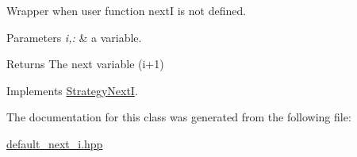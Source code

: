 \-Wrapper when user function next\-I is not defined. 


\begin{DoxyParams}{\-Parameters}
{\em i,\-:} & a variable. \\
\hline
\end{DoxyParams}
\begin{DoxyReturn}{\-Returns}
\-The next variable (i+1) 
\end{DoxyReturn}


\-Implements \hyperlink{classStrategyNextI_a3ae2498d9c8c316b9248e08c9d5ec3a3}{\-Strategy\-Next\-I}.



\-The documentation for this class was generated from the following file\-:\begin{DoxyCompactItemize}
\item 
\hyperlink{default__next__i_8hpp}{default\-\_\-next\-\_\-i.\-hpp}\end{DoxyCompactItemize}
